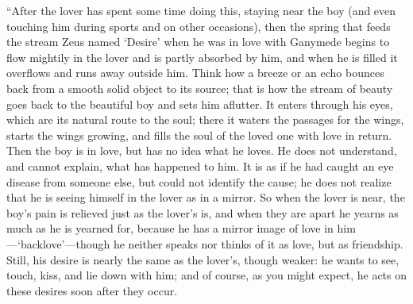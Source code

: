 “After the lover has spent some time doing this, staying near the boy
(and even touching him during sports and on other occasions), then the
spring that feeds the stream Zeus named ‘Desire' when he was in
love with Ganymede begins to flow mightily in the lover and is partly
absorbed by him, and when he is filled it overflows and runs away
outside him. Think how a breeze or an echo bounces back from a smooth
solid object to its source; that is how the stream of beauty goes back
to the beautiful boy and sets him aflutter. It enters through his eyes,
which are its natural route to the soul; there it waters the
passages for the wings, starts the wings growing, and fills the soul of
the loved one with love in return. Then the boy is in love, but has no
idea what he loves. He does not understand, and cannot explain, what has
happened to him. It is as if he had caught an eye disease from someone
else, but could not identify the cause; he does not realize that he is
seeing himself in the lover as in a mirror. So when the lover is near,
the boy's pain is relieved just as the lover's is, and when they are
apart he yearns as much as he is yearned for, because he has a
mirror image of love in him---‘backlove'---though he neither speaks nor
thinks of it as love, but as friendship. Still, his desire is nearly the
same as the lover's, though weaker: he wants to see, touch, kiss, and
lie down with him; and of course, as you might expect, he acts on these
desires soon after they occur.

